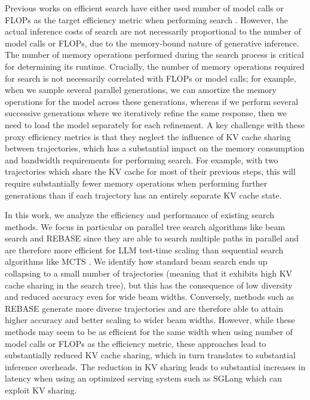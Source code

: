 Previous works on efficient search have either used number of model calls or FLOPs as the target efficiency metric when performing search \cite{qiu2024treebon,wu2024inference, snell2024scaling}. 
However, the actual inference costs of search are not necessarily proportional to the number of model calls or FLOPs, due to the memory-bound nature of generative inference.
The number of memory operations performed during the search process is critical for determining its runtime.
Crucially, the number of memory operations required for search is not necessarily correlated with FLOPs or model calls; for example, when we sample several parallel generations, we can amortize the memory operations for the model across these generations, whereas if we perform several successive generations where we iteratively refine the same response, then we need to load the model separately for each refinement.
A key challenge with these proxy efficiency metrics is that they neglect the influence of KV cache sharing between trajectories, which has a substantial impact on the memory consumption and bandwidth requirements for performing search. 
For example, with two trajectories which share the KV cache for most of their previous steps, this will require substantially fewer memory operations when performing further generations than if each trajectory has an entirely separate KV cache state.

In this work, we analyze the efficiency and performance of existing search methods.
We focus in particular on parallel tree search algorithms like beam search and REBASE \cite{wu2024inference} since they are able to search multiple paths in parallel and are therefore more efficient for LLM test-time scaling than sequential search algorithms like MCTS \cite{snell2024scaling,beeching2024scalingtesttimecompute,wu2024inference}.
We identify how standard beam search ends up collapsing to a small number of trajectories (meaning that it exhibits high KV cache sharing in the search tree), but this has the consequence of low diversity and reduced accuracy even for wide beam widths.
Conversely, methods such as REBASE generate more diverse trajectories and are therefore able to attain higher accuracy and better scaling to wider beam widths.
However, while these methods may seem to be as efficient for the same width when using number of model calls or FLOPs as the efficiency metric, these approaches lead to substantially reduced KV cache sharing, which in turn translates to substantial inference overheads.
The reduction in KV sharing leads to substantial increases in latency when using an optimized serving system such as SGLang \cite{zheng2023efficiently} which can exploit KV sharing. 


